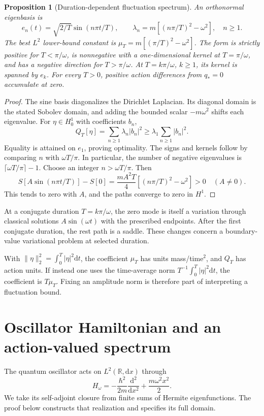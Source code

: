 \documentclass[11pt,a4paper]{article}
\newtheorem{proposition}{Proposition}
\newcommand{\dd}{\mathrm{d}}
\newcommand{\R}{\mathbb R}
\begin{document}
\begin{proposition}[Duration-dependent fluctuation spectrum]\label{prop:hessian}
An orthonormal eigenbasis is
\[
 e_n(t)=\sqrt{2/T}\sin(n\pi t/T),\qquad
 \lambda_n=m[(n\pi/T)^2-\omega^2],\quad n\ge1.
\]
The best $L^2$ lower-bound constant is
$\mu_T=m[(\pi/T)^2-\omega^2]$.
The form is strictly positive for $T<\pi/\omega$, is nonnegative with a
one-dimensional kernel at $T=\pi/\omega$, and has a negative direction for
$T>\pi/\omega$. At $T=k\pi/\omega$, $k\ge1$, its kernel is spanned by $e_k$.
For every $T>0$, positive action differences from $q_*=0$ accumulate at zero.
\end{proposition}
\begin{proof}
The sine basis diagonalizes the Dirichlet Laplacian. Its diagonal domain is
the stated Sobolev domain, and adding the bounded scalar $-m\omega^2$ shifts
each eigenvalue. For $\eta\in H^1_0$ with coefficients $b_n$,
\[
 Q_T[\eta]=\sum_{n\ge1}\lambda_n|b_n|^2
 \ge\lambda_1\sum_{n\ge1}|b_n|^2.
\]
Equality is attained on $e_1$, proving optimality. The signs and kernels follow
by comparing $n$ with $\omega T/\pi$. In particular, the number of negative
eigenvalues is $\lceil\omega T/\pi\rceil-1$.
Choose an integer $n>\omega T/\pi$. Then
\[
 S[A\sin(n\pi t/T)]-S[0]
 =\frac{mA^2T}{4}[(n\pi/T)^2-\omega^2]>0\quad(A\ne0).
\]
This tends to zero with $A$, and the paths converge to zero in $H^1$.
\end{proof}

At a conjugate duration $T=k\pi/\omega$, the zero mode is itself a variation
through classical solutions $A\sin(\omega t)$ with the prescribed endpoints.
After the first conjugate duration, the rest path is a saddle. These changes
concern a boundary-value variational problem at selected duration.

With $\|\eta\|_2^2=\int_0^T|\eta|^2\dd t$, the coefficient $\mu_T$ has units
mass/time$^2$, and $Q_T$ has action units. If instead one uses the time-average
norm $T^{-1}\int_0^T|\eta|^2\dd t$, the coefficient is $T\mu_T$.
Fixing an amplitude norm is therefore part of interpreting a fluctuation bound.

\section{Oscillator Hamiltonian and an action-valued spectrum}
The quantum oscillator acts on $L^2(\R,\dd x)$ through
\[
 H_\omega=-\frac{\hbar^2}{2m}\frac{\dd^2}{\dd x^2}
           +\frac{m\omega^2x^2}{2}.
\]
We take its self-adjoint closure from finite sums of Hermite eigenfunctions.
The proof below constructs that realization and specifies its full domain.
\end{document}

